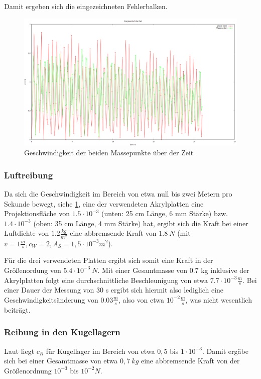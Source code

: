 Damit ergeben sich die eingezeichneten Fehlerbalken. 


\begin{figure}
        \includegraphics[width=.9\textwidth]{images/v_ueber_t.png}
\caption{Geschwindigkeit der beiden Massepunkte über der Zeit}
\label{v_ueber_t}
\end{figure}


\subsubsection{Luftreibung}
Da sich die Geschwindigkeit im Bereich von etwa null bis zwei Metern pro Sekunde bewegt, siehe \ref{v_ueber_t}, eine der verwendeten Akrylplatten eine Projektionsfläche von $ 1.5 \cdot 10^{-3} $ (unten: 25 cm Länge, 6 mm Stärke) bzw. $ 1.4 \cdot 10^{-3} $ (oben: 35 cm Länge, 4 mm Stärke) hat, ergibt sich die Kraft bei einer Luftdichte von $ 1.2 \frac{kg}{m^2} $ eine abbremsende Kraft von $ 1.8 \ N $ (mit $ v = 1 \frac{m}{s}, c_W = 2, A_S = 1,5 \cdot 10^{-3} m^2 $). 

Für die drei verwendeten Platten ergibt sich somit eine Kraft in der Größenordung von $ 5.4 \cdot 10^{-3} \ N $. Mit einer Gesamtmasse von 0.7 kg inklusive der Akrylplatten folgt eine durchschnittliche Beschleunigung von etwa $ 7.7 \cdot 10^{-3} \frac{m}{s} $. Bei einer Dauer der Messung von 30 s ergibt sich hiermit also lediglich eine Geschwindigkeitsänderung von $ 0.03 \frac{m}{s} $, also von etwa $ 10^{-2} \frac{m}{s} $, was nicht wesentlich beiträgt. 


\subsubsection{Reibung in den Kugellagern}
Laut \cite{wiki} liegt $ c_R $ für Kugellager im Bereich von etwa 
$ 0,5 $ bis $ 1 \cdot 10^{-3} $. 
Damit ergäbe sich bei einer Gesamtmasse von etwa $ 0,7 \  kg  $ eine abbremsende Kraft von der Größenordnung $ 10^{-3} $ bis $ 10^{-2} N $. 


